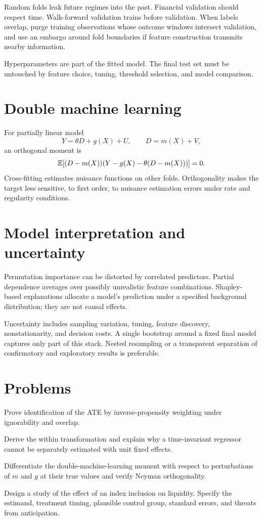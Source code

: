 Random folds leak future regimes into the past. Financial validation should respect
time. Walk-forward validation trains before validation. When labels overlap, purge
training observations whose outcome windows intersect validation, and use an
embargo around fold boundaries if feature construction transmits nearby information.

Hyperparameters are part of the fitted model. The final test set must be untouched
by feature choice, tuning, threshold selection, and model comparison.

\section{Double machine learning}

For partially linear model
\[
Y=\theta D+g(X)+U,\qquad D=m(X)+V,
\]
an orthogonal moment is
\[
\operatorname{\mathbb E}[(D-m(X))(Y-g(X)-\theta(D-m(X)))]=0.
\]
Cross-fitting estimates nuisance functions on other folds. Orthogonality makes the
target less sensitive, to first order, to nuisance estimation errors under rate and
regularity conditions.

\section{Model interpretation and uncertainty}

Permutation importance can be distorted by correlated predictors. Partial
dependence averages over possibly unrealistic feature combinations. Shapley-based
explanations allocate a model's prediction under a specified background
distribution; they are not causal effects.

Uncertainty includes sampling variation, tuning, feature discovery, nonstationarity,
and decision costs. A single bootstrap around a fixed final model captures only part
of this stack. Nested resampling or a transparent separation of confirmatory and
exploratory results is preferable.

\section{Problems}

\begin{exercise}
Prove identification of the ATE by inverse-propensity weighting under ignorability
and overlap.
\end{exercise}
\begin{exercise}
Derive the within transformation and explain why a time-invariant regressor cannot
be separately estimated with unit fixed effects.
\end{exercise}
\begin{exercise}
Differentiate the double-machine-learning moment with respect to perturbations of
$m$ and $g$ at their true values and verify Neyman orthogonality.
\end{exercise}
\begin{exercise}[Research]
Design a study of the effect of an index inclusion on liquidity. Specify the
estimand, treatment timing, plausible control group, standard errors, and threats
from anticipation.
\end{exercise}
